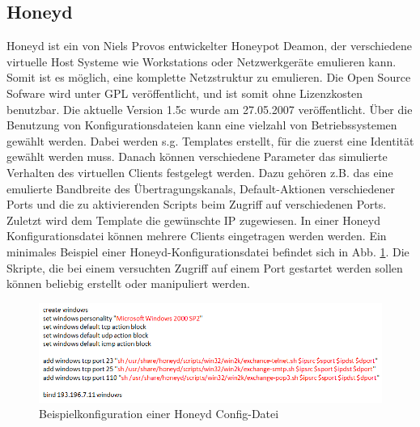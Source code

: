 \subsection{Honeyd}
Honeyd ist ein von Niels Provos entwickelter Honeypot Deamon, der verschiedene virtuelle Host Systeme wie Workstations oder Netzwerkgeräte emulieren kann. Somit ist es möglich, eine komplette Netzstruktur zu emulieren. Die Open Source Sofware wird unter GPL veröffentlicht, und ist somit ohne Lizenzkosten benutzbar. Die aktuelle Version 1.5c wurde am 27.05.2007 veröffentlicht. Über die Benutzung von Konfigurationsdateien kann eine vielzahl von Betriebssystemen gewählt werden. Dabei werden s.g. Templates erstellt, für die zuerst eine Identität gewählt werden muss. Danach können verschiedene Parameter das simulierte Verhalten des virtuellen Clients festgelegt werden. Dazu gehören z.B. das eine emulierte Bandbreite des Übertragungskanals, Default-Aktionen verschiedener Ports und die zu aktivierenden Scripts beim Zugriff auf verschiedenen Ports. Zuletzt wird dem Template die gewünschte IP zugewiesen. In einer Honeyd Konfigurationsdatei können mehrere Clients eingetragen werden werden. Ein minimales Beispiel einer Honeyd-Konfigurationsdatei befindet sich in Abb. \ref{honeydConf}. Die Skripte, die bei einem versuchten Zugriff auf einem Port gestartet werden sollen können beliebig erstellt oder manipuliert werden. 
\\
\begin{figure}[ht]
    \centering\includegraphics[scale=0.7]{Bilder/HoneydConf.png}
  \caption{Beispielkonfiguration einer Honeyd Config-Datei}
  \label{honeydConf}
\end{figure}

